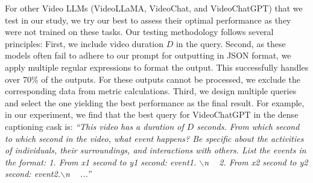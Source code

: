 \documentclass[10pt,twocolumn,letterpaper]{article}
\begin{document}
For other Video LLMs (VideoLLaMA, VideoChat, and VideoChatGPT) that we test in our study, we try our best to assess their optimal performance as they were not trained on these tasks. Our testing methodology follows several principles: First, we include video duration $D$ in the query. Second, as these models often fail to adhere to our prompt for outputting in JSON format, we apply multiple regular expressions to format the output. This successfully handles over 70\% of the outputs. For these outputs cannot be processed, we exclude the corresponding data from metric calculations. Third, we design multiple queries and select the one yielding the best performance as the final result. For example, in our experiment, we find that the best query for VideoChatGPT in the dense captioning cask is: \textit{``This video has a duration of $D$ seconds. From which second to which second in the video, what event happens? Be specific about the activities of individuals, their surroundings, and interactions with others. List the events in the format: 1. From x1 second to y1 second: event1. $\backslash$n ~ 2. From x2 second to y2 second: event2.$\backslash$n ~ ...''}
\end{document}

